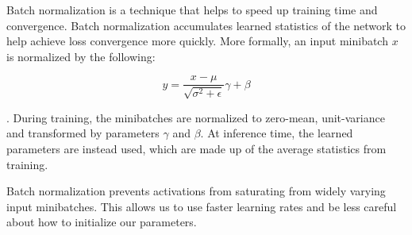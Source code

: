 Batch normalization is a technique that helps to speed up training time and convergence. Batch normalization accumulates learned statistics of the network to help achieve loss convergence more quickly. More formally, an input minibatch $x$ is normalized by the following:

\begin{equation}
y = \dfrac{x-\mu}{\sqrt{\sigma^{2}+\epsilon}}\gamma + \beta
\end{equation}

\cite{ioffe2015batch}. During training, the minibatches are normalized to zero-mean, unit-variance and transformed by parameters $\gamma$ and $\beta$. At inference time, the learned parameters are instead used, which are made up of the average statistics from training.

Batch normalization prevents activations from saturating from widely varying input minibatches. This allows us to use faster learning rates and be less careful about how to initialize our parameters. \cite{ioffe2015batch}
